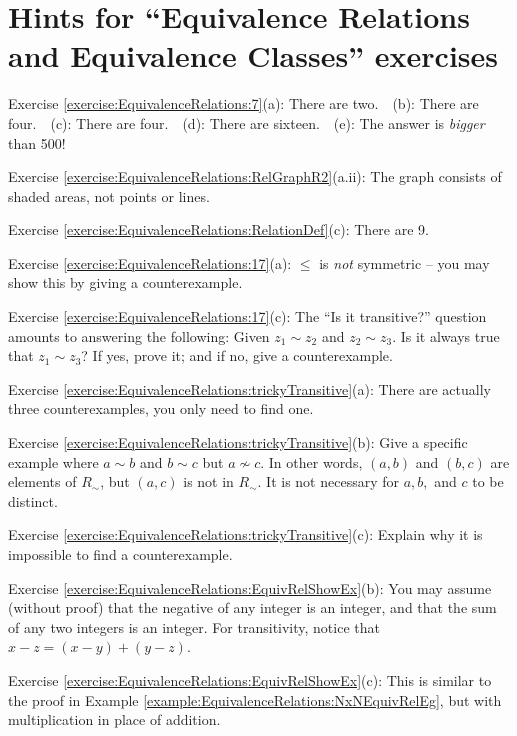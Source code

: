 \section{Hints for ``Equivalence Relations and Equivalence Classes'' exercises}
\label{sec:EquivalenceRelations:Hints} 

\noindent Exercise \ref{exercise:EquivalenceRelations:7}(a): There are two.~~(b): There are four.~~(c): There are four.~~(d): There are sixteen.~~(e): The answer is \emph{bigger} than 500!

\noindent Exercise \ref{exercise:EquivalenceRelations:RelGraphR2}(a.ii): The graph consists of shaded areas, not points or lines.

\noindent Exercise \ref{exercise:EquivalenceRelations:RelationDef}(c): There are 9.

\noindent Exercise \ref{exercise:EquivalenceRelations:17}(a): $\leq$ is \emph{not} symmetric -- you may show this by giving a counterexample.

\noindent Exercise \ref{exercise:EquivalenceRelations:17}(c): The ``Is it transitive?'' question amounts to answering the following:  Given $z_1 \sim z_2$ and $z_2 \sim z_3$.  Is it always true that $z_1 \sim z_3$?  If yes, prove it; and if no, give a counterexample. 

\noindent Exercise \ref{exercise:EquivalenceRelations:trickyTransitive}(a): There are actually three counterexamples, you only need to find one.

\noindent Exercise \ref{exercise:EquivalenceRelations:trickyTransitive}(b): Give a specific example where $a \sim b$ and $b \sim c$ but $a \not\sim c$.  In other words, $(a,b)$ and $(b,c)$ are elements of $R_{\sim}$, but $(a,c)$ is not in  $R_{\sim}$. It is not necessary for $a,b,$ and $c$ to be distinct.

\noindent Exercise \ref{exercise:EquivalenceRelations:trickyTransitive}(c): Explain why it is impossible to find a counterexample.

\noindent Exercise \ref{exercise:EquivalenceRelations:EquivRelShowEx}(b): You may assume (without proof) that the negative of any integer is an integer, and that the sum of any two integers is an integer. For transitivity, notice that $x - z = (x - y) + (y - z)$.

\noindent Exercise \ref{exercise:EquivalenceRelations:EquivRelShowEx}(c): This is similar to the proof in Example \ref{example:EquivalenceRelations:NxNEquivRelEg}, but with multiplication in place of addition.


